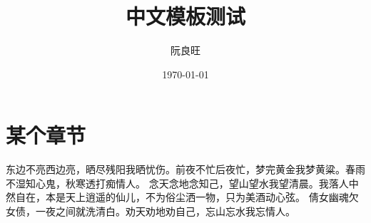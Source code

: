 \documentclass{ctexart}
\title{中文模板测试}
\author{阮良旺}
\date{\today}
\begin{document}
    \maketitle
    \section{某个章节}
    东边不亮西边亮，晒尽残阳我晒忧伤。前夜不忙后夜忙，梦完黄金我梦黄粱。春雨不湿知心鬼，秋寒透打痴情人。
    念天念地念知己，望山望水我望清晨。我落人中然自在，本是天上逍遥的仙儿，不为俗尘洒一物，只为美酒动心弦。
    倩女幽魂欠女债，一夜之间就洗清白。劝天劝地劝自己，忘山忘水我忘情人。
\end{document}
